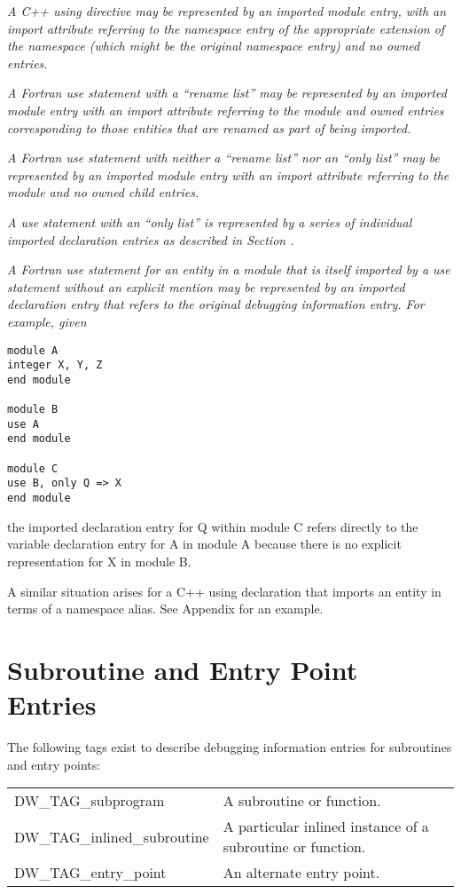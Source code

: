 \textit{A C++ using directive may be represented by an imported module
entry, with an import attribute referring to the namespace
entry of the appropriate extension of the namespace (which
might be the original namespace entry) and no owned entries.
}

\textit{A Fortran use statement with a “rename list” may be
represented by an imported module entry with an import
attribute referring to the module and owned entries
corresponding to those entities that are renamed as part of
being imported.
}

\textit{A Fortran use statement with neither a “rename list” nor
an “only list” may be represented by an imported module
entry with an import attribute referring to the module and
no owned child entries.
}

\textit{A use statement with an “only list” is represented by a
series of individual imported declaration entries as described
in Section .
}

\textit{A Fortran use statement for an entity in a module that is
itself imported by a use statement without an explicit mention
may be represented by an imported declaration entry that refers
to the original debugging information entry. For example, given
}
\begin{lstlisting}
module A
integer X, Y, Z
end module

module B
use A
end module

module C
use B, only Q => X
end module
\end{lstlisting}

the imported declaration entry for Q within module C refers
directly to the variable declaration entry for A in module A
because there is no explicit representation for X in module B.

A similar situation arises for a C++ using declaration that
imports an entity in terms of a namespace alias. See 
Appendix  
for an example.


\section{Subroutine and Entry Point Entries}
\label{chap:subroutineandentrypointentries}

The following tags exist to describe debugging information entries for subroutines and entry
points:

\begin{tabular}{lp{9.0cm}}
DW\_TAG\_subprogram & A subroutine or function. \\
DW\_TAG\_inlined\_subroutine & A particular inlined 
  instance of a subroutine or function. \\
DW\_TAG\_entry\_point & An alternate entry point. \\
\end{tabular}

